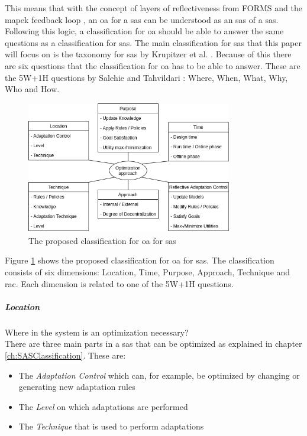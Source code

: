\noindent This means that with the concept of layers of reflectiveness from FORMS \cite*{FORMS} and the \acrshort{mapek} feedback loop \cite*{VisionOfAutonomicComputing},
an \acrshort{oa} for a \acrshort{sas} can be understood as an \acrshort{sas} of a \acrshort{sas}.
Following this logic, a classification for \acrshort{oa} should be able to answer the same questions as a classification for \acrshort{sas}.
The main classification for \acrshort{sas} that this paper will focus on is the taxonomy for \acrshort{sas} by Krupitzer et al. \cite*{SurveyOnEngineeringApproaches}.
Because of this there are six questions that the classification for \acrshort{oa} has to be able to answer.
These are the 5W+1H questions by Salehie and Tahvildari \cite*{LandscapeAndResearchChallenges}: Where, When, What, Why, Who and How.

\begin{figure}[h]
    \centering
    \includegraphics[width=0.8\textwidth]{images/ClassificationProposal-WithDimensions.png}
    \caption{The proposed classification for \acrshort{oa} for \acrshort{sas}}
    \label{fig:Proposal}
\end{figure}

\noindent Figure \ref{fig:Proposal} shows the proposed classification for \acrshort{oa} for \acrshort{sas}.
The classification consists of six dimensions: Location, Time, Purpose, Approach, Technique and \acrfull{rac}.
Each dimension is related to one of the 5W+1H questions.

\subparagraph*{Location}
Where in the system is an optimization necessary? \\
There are three main parts in a \acrshort{sas} that can be optimized as explained in chapter \ref{ch:SASClassification}.
These are:
\begin{itemize}[nosep]
    \item The \textit{Adaptation Control} which can, for example, be optimized by changing or generating new adaptation rules
    \item The \textit{Level} on which adaptations are performed
    \item The \textit{Technique} that is used to perform adaptations
\end{itemize}

